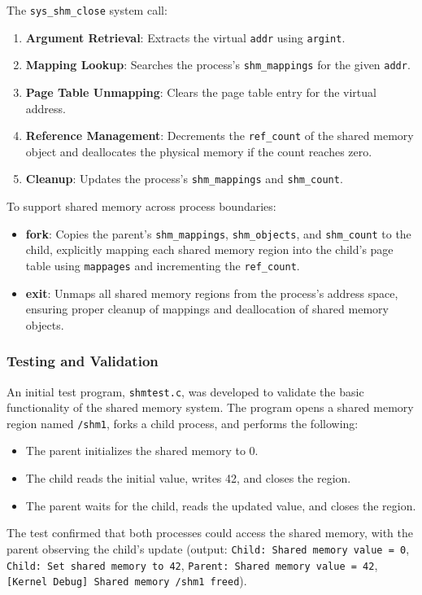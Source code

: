\documentclass[12pt]{article}
\begin{document}
The \texttt{sys\_shm\_close} system call:
\begin{enumerate}
  \item \textbf{Argument Retrieval}: Extracts the virtual \texttt{addr} using \texttt{argint}.
  \item \textbf{Mapping Lookup}: Searches the process’s \texttt{shm\_mappings} for the given \texttt{addr}.
  \item \textbf{Page Table Unmapping}: Clears the page table entry for the virtual address.
  \item \textbf{Reference Management}: Decrements the \texttt{ref\_count} of the shared memory object and deallocates the physical memory if the count reaches zero.
  \item \textbf{Cleanup}: Updates the process’s \texttt{shm\_mappings} and \texttt{shm\_count}.
\end{enumerate}

To support shared memory across process boundaries:
\begin{itemize}
  \item \textbf{fork}: Copies the parent’s \texttt{shm\_mappings}, \texttt{shm\_objects}, and \texttt{shm\_count} to the child, explicitly mapping each shared memory region into the child’s page table using \texttt{mappages} and incrementing the \texttt{ref\_count}.
  \item \textbf{exit}: Unmaps all shared memory regions from the process’s address space, ensuring proper cleanup of mappings and deallocation of shared memory objects.
\end{itemize}

\subsubsection{Testing and Validation}
\label{subsubsec:shared-memory-testing}

An initial test program, \texttt{shmtest.c}, was developed to validate the basic functionality of the shared memory system. The program opens a shared memory region named \texttt{/shm1}, forks a child process, and performs the following:
\begin{itemize}
  \item The parent initializes the shared memory to 0.
  \item The child reads the initial value, writes 42, and closes the region.
  \item The parent waits for the child, reads the updated value, and closes the region.
\end{itemize}
The test confirmed that both processes could access the shared memory, with the parent observing the child’s update (output: \texttt{Child: Shared memory value = 0}, \texttt{Child: Set shared memory to 42}, \texttt{Parent: Shared memory value = 42}, \texttt{[Kernel Debug] Shared memory /shm1 freed}).
\end{document}
